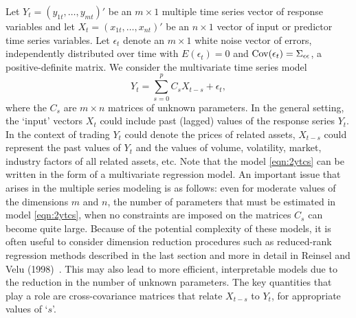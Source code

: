 Let $Y_t= (y_{1t}, \ldots, y_{mt})'$ be an $m \times 1$ multiple time series vector of response variables and let $X_t=(x_{1t}, \ldots, x_{nt})'$ be an $n \times 1$ vector of input or predictor time series variables. Let $\epsilon_t$ denote an $m \times 1$ white noise vector of errors, independently distributed over time with $E(\epsilon_t)= 0$ and $\operatorname{Cov}(\epsilon_t)= \Sigma_{\epsilon\epsilon}$, a positive-definite matrix. We consider the multivariate time series model
	\begin{equation} \label{eqn:2ytcs}
	Y_{t} = \sum_{s=0}^{p} C_s X_{t-s} + \epsilon_t,
	\end{equation}
where the $C_s$ are $m \times n$ matrices of unknown parameters. In the general setting, the `input' vectors $X_t$ could include past (lagged) values of the response series $Y_t$. In the context of trading $Y_t$ could denote the prices of related assets, $X_{t-s}$ could represent the past values of $Y_t$ and the values of volume, volatility, market, industry factors of all related assets, etc. Note that the model \eqref{eqn:2ytcs} can be written in the form of a multivariate regression model. An important issue that arises in the multiple series modeling is as follows: even for moderate values of the dimensions $m$ and $n$, the number of parameters that must be estimated in model \eqref{eqn:2ytcs}, when no constraints are imposed on the matrices $C_s$ can become quite large. Because of the potential complexity of these models, it is often useful to consider dimension reduction procedures such as reduced-rank regression methods described in the last section and more in detail in Reinsel and Velu (1998)~\cite{velurein}. This may also lead to more efficient, interpretable models due to the reduction in the number of unknown parameters. The key quantities that play a role are cross-covariance matrices that relate $X_{t-s}$ to $Y_t$, for appropriate values of `$s$'. 


